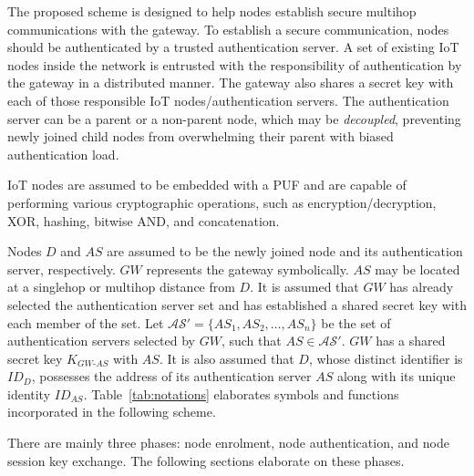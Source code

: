 \documentclass[conference]{IEEEtran}
\begin{document}
The proposed scheme is designed to help nodes establish secure multihop
communications with the gateway.  To establish a secure communication, nodes
should be authenticated by a trusted authentication server.  A set of
existing IoT nodes inside the network is entrusted with the responsibility of
authentication by the gateway in a distributed manner.  The gateway also
shares a secret key with each of those responsible IoT
nodes/authentication servers.  The authentication server can be a parent or
a non-parent node, which may be \emph{decoupled}, preventing newly joined
child nodes from overwhelming their parent with biased authentication load.

IoT nodes are assumed to be embedded with a PUF and are capable of performing
various cryptographic operations, such as encryption/decryption, XOR,
hashing, bitwise AND, and concatenation.

Nodes $D$ and $AS$ are assumed to be the newly joined node and its
authentication server, respectively.  $GW$ represents the gateway
symbolically.  $AS$ may be located at a singlehop or multihop distance from
$D$.  It is assumed that $GW$ has already selected the authentication server
set and has established a shared secret key with each member of the set.
Let $\mathcal{AS}' = \{AS_1, AS_2, \ldots, AS_n\}$ be the set of
authentication servers selected by $GW$, such that $AS \in \mathcal{AS}'$.
$GW$ has a shared secret key $K_{GW\text{-}AS}$ with $AS$.  It is also
assumed that $D$, whose distinct identifier is $ID_D$, possesses the address
of its authentication server $AS$ along with its unique identity $ID_{AS}$.
Table~\ref{tab:notations} elaborates symbols and functions incorporated in
the following scheme.

There are mainly three phases: node enrolment, node authentication, and node
session key exchange.  The following sections elaborate on these phases.
\end{document}
